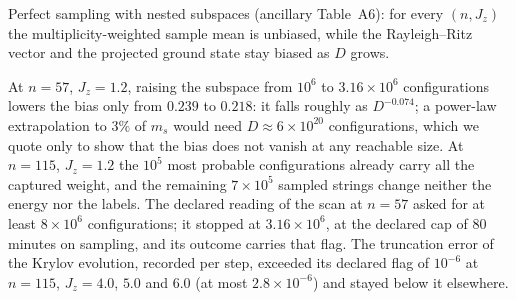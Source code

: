 \documentclass[aps,prx,onecolumn,10pt,nofootinbib,longbibliography,floatfix]{revtex4-2}
\theoremstyle{remark}
\newcommand{\Jz}{J_z}
\newcommand{\ms}{m_s}
\begin{document}
\noindent Perfect sampling with nested subspaces (ancillary Table~A6): for every $(n,\Jz)$ the multiplicity-weighted %
sample mean is unbiased, while the Rayleigh--Ritz vector and the projected ground state stay biased as $D$ grows.

\noindent At $n=57$, $\Jz=1.2$, raising the subspace from $10^6$ to $3.16\times10^6$ configurations lowers the %
bias only from $0.239$ to $0.218$: %
it falls roughly as $D^{-0.074}$; a power-law extrapolation to $3\%$ of $\ms$ %
would need $D\approx6\times10^{20}$ configurations, which we quote only to show that the bias does not vanish at any reachable %
size. At $n=115$, $\Jz=1.2$ the $10^5$ most probable configurations already carry all the captured weight, and the %
remaining $7\times10^5$ sampled strings change neither the energy nor the labels. %
The declared reading of the scan at $n=57$ asked for at least $8\times10^6$ configurations; it stopped at %
$3.16\times10^6$, at the declared cap of $80$ minutes on sampling, and its outcome carries that flag. The %
truncation error of the Krylov evolution, recorded per step, exceeded its declared flag of $10^{-6}$ at $n=115$, %
$\Jz=4.0$, $5.0$ and $6.0$ (at most $2.8\times10^{-6}$) and stayed below it elsewhere. %
\end{document}
